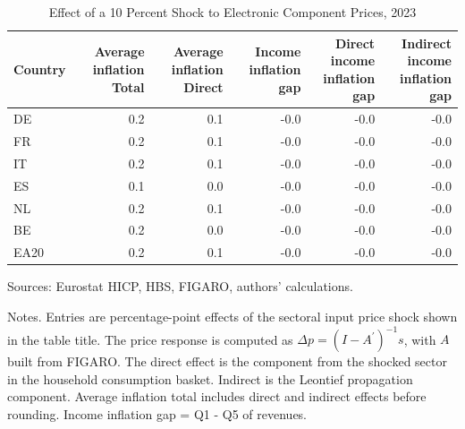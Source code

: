 \begin{table}[H]
\centering
\caption{Effect of a 10 Percent Shock to Electronic Component Prices, 2023}
\scriptsize
\setlength{\tabcolsep}{4.2pt}
\begin{tabular}{lrrrrr}
\toprule
Country & \shortstack{Average inflation\\Total} & \shortstack{Average inflation\\Direct} & \shortstack{Income inflation\\gap} & \shortstack{Direct income\\inflation gap} & \shortstack{Indirect income\\inflation gap}
 \\
\midrule
DE & 0.2 & 0.1 & -0.0 & -0.0 & -0.0
 \\
FR & 0.2 & 0.1 & -0.0 & -0.0 & -0.0
 \\
IT & 0.2 & 0.1 & -0.0 & -0.0 & -0.0
 \\
ES & 0.1 & 0.0 & -0.0 & -0.0 & -0.0
 \\
NL & 0.2 & 0.1 & -0.0 & -0.0 & -0.0
 \\
BE & 0.2 & 0.0 & -0.0 & -0.0 & -0.0
 \\
EA20 & 0.2 & 0.1 & -0.0 & -0.0 & -0.0
 \\
\bottomrule
\end{tabular}
\par\vspace{0.35em}\footnotesize\noindent Sources: Eurostat HICP, HBS, FIGARO, authors' calculations.
\par\vspace{0.25em}\footnotesize\noindent Notes. Entries are percentage-point effects of the sectoral input price shock shown in the table title. The price response is computed as $\Delta p = (I - A^{\prime})^{-1}s$, with $A$ built from FIGARO. The direct effect is the component from the shocked sector in the household consumption basket. Indirect is the Leontief propagation component. Average inflation total includes direct and indirect effects before rounding. Income inflation gap = Q1 - Q5 of revenues.
\end{table}
\vspace{0.6em}
